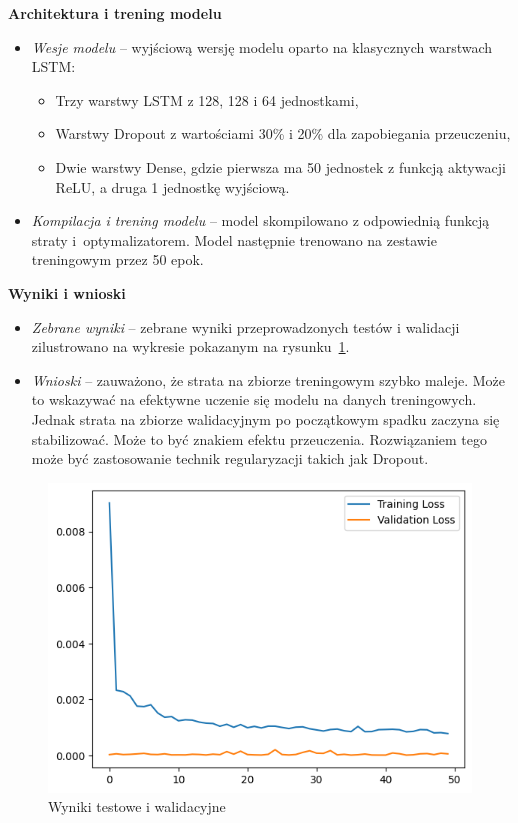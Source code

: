 \noindent \textbf{Architektura i trening modelu~~}
\begin{itemize}
\item \emph{Wesje modelu} -- wyjściową wersję modelu oparto na klasycznych warstwach LSTM:
\begin{itemize}
    \item Trzy warstwy LSTM z 128, 128 i 64 jednostkami,
    \item Warstwy Dropout z wartościami 30\% i 20\% dla zapobiegania przeuczeniu,
    \item Dwie warstwy Dense, gdzie pierwsza ma 50 jednostek z funkcją aktywacji ReLU, a druga 1 jednostkę wyjściową.
\end{itemize}
\item \emph{Kompilacja i trening modelu} -- model skompilowano z odpowiednią funkcją straty i~optymalizatorem. Model następnie trenowano na zestawie treningowym przez 50 epok.
\end{itemize}

\noindent \textbf{Wyniki i wnioski~~}
\begin{itemize}
\item \emph{Zebrane wyniki} -- zebrane wyniki przeprowadzonych testów i walidacji zilustrowano na wykresie pokazanym na rysunku~\ref{fig:Wyniki_testowe_i_walidacyjne}.
\item \emph{Wnioski} -- zauważono, że strata na zbiorze treningowym szybko maleje. Może to wskazywać na efektywne uczenie się modelu na danych treningowych. Jednak strata na zbiorze walidacyjnym po początkowym spadku zaczyna się stabilizować. Może to być znakiem efektu przeuczenia. Rozwiązaniem tego może być zastosowanie technik regularyzacji takich jak Dropout.
\end{itemize}
\begin{figure}[htb]
    \centering
    \includegraphics[width=0.8\linewidth]{Wyniki_testowe_i_walidacyjne.png}
    \caption{Wyniki testowe i walidacyjne}
    \label{fig:Wyniki_testowe_i_walidacyjne}
\end{figure}

